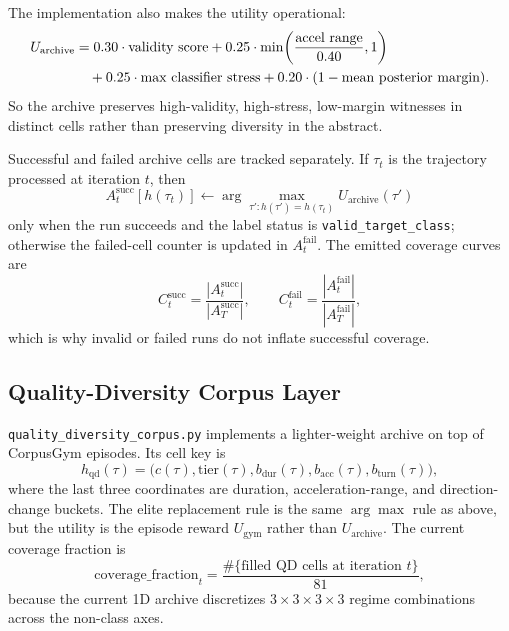 \documentclass[11pt]{article}
\begin{document}
The implementation also makes the utility operational:
\begin{align}
    U_{\text{archive}}
    &=
    0.30 \cdot \text{validity score}
    + 0.25 \cdot \min\!\left(\frac{\text{accel range}}{0.40}, 1\right)
    \notag \\
    &\quad
    + 0.25 \cdot \text{max classifier stress}
    + 0.20 \cdot (1 - \text{mean posterior margin}).
\end{align}
So the archive preserves high-validity, high-stress, low-margin witnesses in
distinct cells rather than preserving diversity in the abstract.

Successful and failed archive cells are tracked separately. If \(\tau_t\) is
the trajectory processed at iteration \(t\), then
\begin{equation}
    A_t^{\text{succ}}[h(\tau_t)]
    \leftarrow
    \arg\max_{\tau' : h(\tau') = h(\tau_t)}
    U_{\text{archive}}(\tau')
\end{equation}
only when the run succeeds and the label status is
\texttt{valid\_target\_class}; otherwise the failed-cell counter is updated in
\(A_t^{\text{fail}}\). The emitted coverage curves are
\begin{equation}
    C_t^{\text{succ}}
    =
    \frac{|A_t^{\text{succ}}|}{|A_T^{\text{succ}}|},
    \qquad
    C_t^{\text{fail}}
    =
    \frac{|A_t^{\text{fail}}|}{|A_T^{\text{fail}}|},
\end{equation}
which is why invalid or failed runs do not inflate successful coverage.

\subsection*{Quality-Diversity Corpus Layer}

\texttt{quality\_diversity\_corpus.py} implements a lighter-weight archive on
top of CorpusGym episodes. Its cell key is
\begin{equation}
    h_{\text{qd}}(\tau)
    =
    \big(
        c(\tau),
        \mathrm{tier}(\tau),
        b_{\mathrm{dur}}(\tau),
        b_{\mathrm{acc}}(\tau),
        b_{\mathrm{turn}}(\tau)
    \big),
\end{equation}
where the last three coordinates are duration, acceleration-range, and
direction-change buckets. The elite replacement rule is the same
\(\arg\max\) rule as above, but the utility is the episode reward
\(U_{\text{gym}}\) rather than \(U_{\text{archive}}\). The current coverage
fraction is
\begin{equation}
    \mathrm{coverage\_fraction}_t
    =
    \frac{\#\{\text{filled QD cells at iteration } t\}}{81},
\end{equation}
because the current 1D archive discretizes \(3 \times 3 \times 3 \times 3\)
regime combinations across the non-class axes.
\end{document}
